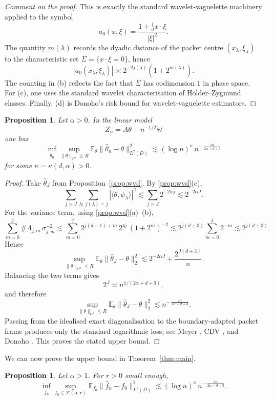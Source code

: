 \documentclass[11pt]{article}
\newtheorem{proposition}[theorem]{Proposition}
\newcommand{\E}{\mathbb E}
\begin{document}
\begin{proof}[Comment on the proof]
This is exactly the standard wavelet-vaguelette machinery applied to the symbol
\[
a_0(x,\xi)=\frac{1+\frac{i}{d}x\cdot \xi}{|\xi|^2}.
\]
The quantity $m(\lambda)$ records the dyadic distance of the packet centre $(x_\lambda,\xi_\lambda)$ to the characteristic set $\Sigma=\{x\cdot \xi=0\}$, hence
\[
|a_0(x_\lambda,\xi_\lambda)|\asymp 2^{-2j(\lambda)}(1+2^{m(\lambda)}).
\]
The counting in (b) reflects the fact that $\Sigma$ has codimension $1$ in phase space. For (c), one uses the standard wavelet characterisation of Hölder--Zygmund classes. Finally, (d) is Donoho's risk bound for wavelet-vaguelette estimators.
\end{proof}

\begin{proposition}\label{prop:upper-linear}
Let $\alpha>0$. In the linear model
\[
Z_n=A\theta+n^{-1/2}\mathbb W
\]
one has
\[
\inf_{\hat\theta_n}
\sup_{\|\theta\|_{C^\alpha}\le R}
\E_\theta\|\hat\theta_n-\theta\|_{L^2(D)}^2
\lesssim
(\log n)^\kappa\, n^{-\,\frac{2\alpha}{2\alpha+d+3}}
\]
for some $\kappa=\kappa(d,\alpha)>0$.
\end{proposition}

\begin{proof}
Take $\hat\theta_J$ from Proposition~\ref{prop:wvd}. By \ref{prop:wvd}(c),
\[
\sum_{j>J}\sum_{\lambda:\ j(\lambda)=j} |\langle \theta,\psi_\lambda\rangle|^2
\lesssim
\sum_{j>J}2^{-2\alpha j}
\lesssim 2^{-2\alpha J}.
\]
For the variance term, using \ref{prop:wvd}(a)--(b),
\[
\sum_{m=0}^j \#\Lambda_{j,m}\,\sigma_{j,m}^{-2}
\lesssim
\sum_{m=0}^j 2^{j(d-1)+m}\, 2^{4j}\,(1+2^m)^{-2}
\lesssim
2^{j(d+3)}\sum_{m=0}^j 2^{-m}
\lesssim
2^{j(d+3)}.
\]
Hence
\[
\sup_{\|\theta\|_{C^\alpha}\le R}\E_\theta\|\hat\theta_J-\theta\|_2^2
\lesssim
2^{-2\alpha J}+\frac{2^{J(d+3)}}{n}.
\]
Balancing the two terms gives
\[
2^J\asymp n^{1/(2\alpha+d+3)},
\]
and therefore
\[
\sup_{\|\theta\|_{C^\alpha}\le R}\E_\theta\|\hat\theta_J-\theta\|_2^2
\lesssim
n^{-\,\frac{2\alpha}{2\alpha+d+3}}.
\]
Passing from the idealised exact diagonalisation to the boundary-adapted packet frame produces only the standard logarithmic loss; see Meyer \cite[Ch.~VI]{Meyer}, CDV \cite{CDV}, and Donoho \cite{Donoho95}. This proves the stated upper bound.
\end{proof}

We can now prove the upper bound in Theorem~\ref{thm:main}.

\begin{proposition}\label{prop:upper-nonlinear}
Let $\alpha>1$. For $r>0$ small enough,
\[
\inf_{\hat f_n}\sup_{f_0\in \mathcal F(\alpha,r)}
\E_{f_0}\|\hat f_n-f_0\|_{L^2(D)}^2
\lesssim
(\log n)^\kappa\, n^{-\,\frac{2\alpha}{2\alpha+d+3}}.
\]
\end{proposition}
\end{document}
